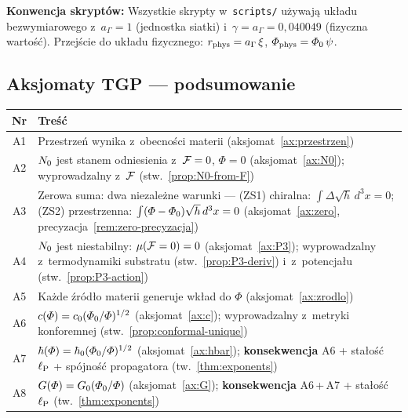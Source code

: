 \medskip\noindent
\textbf{Konwencja skrypt\'ow:} Wszystkie skrypty w~\texttt{scripts/}
u\.zywaj\k{a} uk\l{}adu bezwymiarowego z~$a_\Gamma = 1$ (jednostka siatki)
i~$\gamma = a_\Gamma = 0{,}040049$ (fizyczna warto\'s\'c). Przej\'scie
do uk\l{}adu fizycznego: $r_{\rm phys} = a_\Gamma\,\xi$,
$\varPhi_{\rm phys} = \varPhi_0\,\psi$.

\subsection{Aksjomaty TGP --- podsumowanie}

\begin{center}
\begin{tabular}{@{}cp{12.5cm}@{}}
\toprule
\textbf{Nr} & \textbf{Tre\'s\'c} \\
\midrule
A1 & Przestrze\'n wynika z~obecno\'sci materii
     (aksjomat~\ref{ax:przestrzen}) \\
A2 & $N_0$ jest stanem odniesienia z~$\mathcal{F} = 0$, $\Phi = 0$
     (aksjomat~\ref{ax:N0}); wyprowadzalny z~$\mathcal{F}$
     (stw.~\ref{prop:N0-from-F}) \\
A3 & Zerowa suma: dwa niezale\.zne warunki ---
     (ZS1) chiralna: $\int\Delta\sqrt{h}\,d^3x = 0$;
     (ZS2) przestrzenna: $\int(\varPhi-\varPhi_0)\sqrt{h}\,d^3x = 0$
     (aksjomat~\ref{ax:zero}, precyzacja~\ref{rem:zero-precyzacja}) \\
A4 & $N_0$ jest niestabilny: $\mu(\mathcal{F}=0) = 0$
     (aksjomat~\ref{ax:P3}); wyprowadzalny z~termodynamiki
     substratu (stw.~\ref{prop:P3-deriv}) i~z~potencja\l{}u
     (stw.~\ref{prop:P3-action}) \\
A5 & Ka\.zde \'zr\'od\l{}o materii generuje wk\l{}ad do $\Phi$
     (aksjomat~\ref{ax:zrodlo}) \\
A6 & $c(\varPhi) = c_0(\varPhi_0/\varPhi)^{1/2}$
     (aksjomat~\ref{ax:c}); wyprowadzalny z~metryki konforemnej
     (stw.~\ref{prop:conformal-unique}) \\
A7 & $\hbar(\varPhi) = \hbar_0(\varPhi_0/\varPhi)^{1/2}$
     (aksjomat~\ref{ax:hbar}); \textbf{konsekwencja} A6 + sta\l{}o\'s\'c
     $\ell_{\mathrm{P}}$ + sp\'ojno\'s\'c propagatora (tw.~\ref{thm:exponents}) \\
A8 & $G(\varPhi) = G_0(\varPhi_0/\varPhi)$
     (aksjomat~\ref{ax:G}); \textbf{konsekwencja} A6\,+\,A7 + sta\l{}o\'s\'c
     $\ell_{\mathrm{P}}$ (tw.~\ref{thm:exponents}) \\
\bottomrule
\end{tabular}
\end{center}

